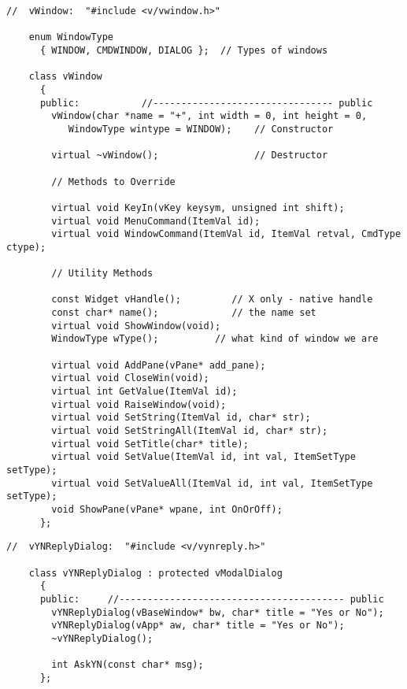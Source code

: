 
\footnotesize
\begin{verbatim}
//  vWindow:  "#include <v/vwindow.h>"

    enum WindowType
      { WINDOW, CMDWINDOW, DIALOG };  // Types of windows

    class vWindow
      {
      public:           //-------------------------------- public
        vWindow(char *name = "+", int width = 0, int height = 0,
           WindowType wintype = WINDOW);    // Constructor

        virtual ~vWindow();                 // Destructor

        // Methods to Override

        virtual void KeyIn(vKey keysym, unsigned int shift);
        virtual void MenuCommand(ItemVal id);
        virtual void WindowCommand(ItemVal id, ItemVal retval, CmdType ctype);

        // Utility Methods

        const Widget vHandle();         // X only - native handle
        const char* name();             // the name set
        virtual void ShowWindow(void);
        WindowType wType();          // what kind of window we are

        virtual void AddPane(vPane* add_pane);
        virtual void CloseWin(void);
        virtual int GetValue(ItemVal id);
        virtual void RaiseWindow(void);
        virtual void SetString(ItemVal id, char* str);
        virtual void SetStringAll(ItemVal id, char* str);
        virtual void SetTitle(char* title);
        virtual void SetValue(ItemVal id, int val, ItemSetType setType);
        virtual void SetValueAll(ItemVal id, int val, ItemSetType setType);
        void ShowPane(vPane* wpane, int OnOrOff);
      };
\end{verbatim}
\normalfont\normalsize

\footnotesize
\begin{verbatim}
//  vYNReplyDialog:  "#include <v/vynreply.h>"

    class vYNReplyDialog : protected vModalDialog
      {
      public:     //---------------------------------------- public
        vYNReplyDialog(vBaseWindow* bw, char* title = "Yes or No");
        vYNReplyDialog(vApp* aw, char* title = "Yes or No");
        ~vYNReplyDialog();

        int AskYN(const char* msg);
      };
\end{verbatim}
\normalfont\normalsize
